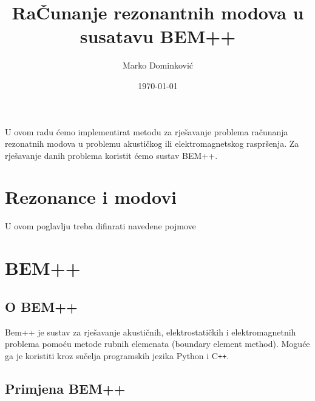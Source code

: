 \documentclass[a4paper,twoside,12pt]{memoir} %
\title{RaČunanje rezonantnih modova u susatavu BEM++}
\author{Marko Dominković}
\date{\monthyeardate\today}  %
\begin{document}
\frontmatter


\begin{intro}
U ovom radu ćemo implementirat metodu za rješavanje problema računanja rezonatnih modova u problemu akustičkog ili elektromagnetskog raspršenja.  Za rješavanje danih problema koristit ćemo sustav BEM++.    
\end{intro}

\chapter{Rezonance i modovi}

U ovom poglavlju treba difinrati navedene pojmove


\chapter{BEM++}	
\section{O BEM++}

\cite{bempp} Bem++ je sustav za rješavanje akustičnih, elektrostatičkih i elektromagnetnih problema pomoću metode rubnih elemenata (boundary element method). Moguće ga je koristiti kroz sučelja programskih jezika Python i C\texttt{++}.

\section{Primjena BEM++}
\end{document}
